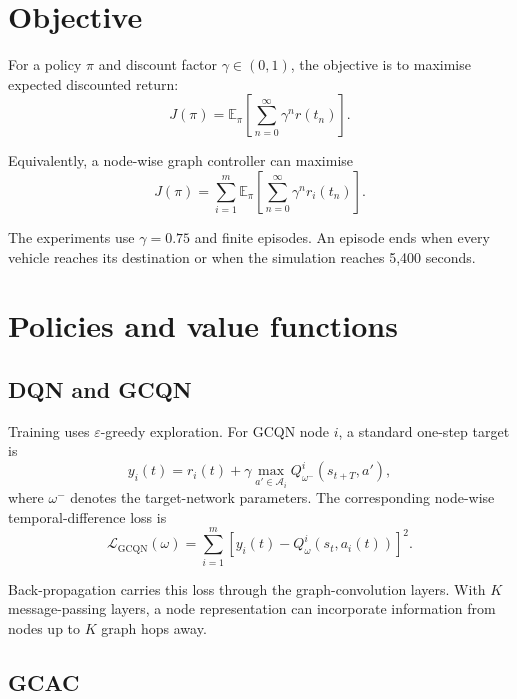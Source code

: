 \documentclass[11pt]{article}
\begin{document}
\section{Objective}

For a policy $\pi$ and discount factor $\gamma\in(0,1)$, the objective is to maximise expected discounted return:
\begin{equation}
J(\pi)
=
\mathbb{E}_{\pi}
\left[
\sum_{n=0}^{\infty}\gamma^n r(t_n)
\right].
\end{equation}

Equivalently, a node-wise graph controller can maximise
\begin{equation}
J(\pi)
=
\sum_{i=1}^{m}
\mathbb{E}_{\pi}
\left[
\sum_{n=0}^{\infty}\gamma^n r_i(t_n)
\right].
\end{equation}

The experiments use $\gamma=0.75$ and finite episodes. An episode ends when every vehicle reaches its destination or when the simulation reaches 5,400 seconds.

\section{Policies and value functions}

\subsection{DQN and GCQN}

Training uses $\varepsilon$-greedy exploration. For GCQN node $i$, a standard one-step target is
\begin{equation}
y_i(t)
=
r_i(t)
+
\gamma\max_{a'\in\mathcal{A}_i}
Q_{\omega^-}^{i}\!\left(s_{t+T},a'\right),
\end{equation}
where $\omega^-$ denotes the target-network parameters. The corresponding node-wise temporal-difference loss is
\begin{equation}
\mathcal{L}_{\mathrm{GCQN}}(\omega)
=
\sum_{i=1}^{m}
\left[
y_i(t)-Q_{\omega}^{i}\!\left(s_t,a_i(t)\right)
\right]^2.
\end{equation}

Back-propagation carries this loss through the graph-convolution layers. With $K$ message-passing layers, a node representation can incorporate information from nodes up to $K$ graph hops away.

\subsection{GCAC}
\end{document}
